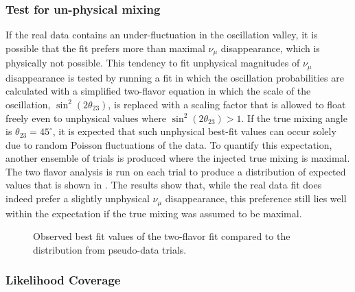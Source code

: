 \subsubsection{Test for un-physical mixing}
If the real data contains an under-fluctuation in the oscillation valley, it is possible that the fit prefers more than maximal $\nu_\mu$ disappearance, which is physically not possible. This tendency to fit unphysical magnitudes of $\nu_\mu$ disappearance is tested by running a fit in which the oscillation probabilities are calculated with a simplified two-flavor equation in which the scale of the oscillation, $\sin^2(2\theta_{23})$, is replaced with a scaling factor that is allowed to float freely even to unphysical values where $\sin^2(2\theta_{23}) > 1$. If the true mixing angle is $\theta_{23}=45^\circ$, it is expected that such unphysical best-fit values can occur solely due to random Poisson fluctuations of the data. To quantify this expectation, another ensemble of trials is produced where the injected true mixing is maximal. The two flavor analysis is run on each trial to produce a distribution of expected values that is shown in . The results show that, while the real data fit does indeed prefer a slightly unphysical $\nu_\mu$ disappearance, this preference still lies well within the expectation if the true mixing was assumed to be maximal.

\begin{figure}
    \centering
    
    \caption{Observed best fit values of the two-flavor fit compared to the distribution from pseudo-data trials.}
    \label{fig:two-flavor-ensemble}
\end{figure}

\subsubsection{Likelihood Coverage}

